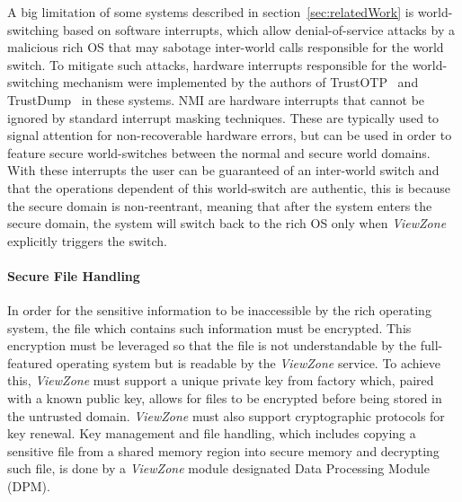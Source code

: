 A big limitation of some systems described in section~\ref{sec:relatedWork} is world-switching based on software interrupts, which allow denial-of-service attacks by a malicious rich OS that may sabotage inter-world calls responsible for the world switch. To mitigate such attacks, hardware interrupts responsible for the world-switching mechanism were implemented by the authors of TrustOTP~\cite{sun2015trustotp} and TrustDump~\cite{sun2015reliable} in these systems. \ac{NMI} are hardware interrupts that cannot be ignored by standard interrupt masking techniques. These are typically used to signal attention for non-recoverable hardware errors, but can be used in order to feature secure world-switches between the normal and secure world domains. With these interrupts the user can be guaranteed of an inter-world switch and that the operations dependent of this world-switch are authentic, this is because the secure domain is non-reentrant, meaning that after the system enters the secure domain, the system will switch back to the rich OS only when \emph{ViewZone} explicitly triggers the switch.

\paragraph{\textbf{Secure File Handling}}


In order for the sensitive information to be inaccessible by the rich operating system, the file which contains such information must be encrypted. This encryption must be leveraged so that the file is not understandable by the full-featured operating system but is readable by the \emph{ViewZone} service. To achieve this, \emph{ViewZone} must support a unique private key from factory which, paired with a known public key, allows for files to be encrypted before being stored in the untrusted domain. \emph{ViewZone} must also support cryptographic protocols for key renewal. Key management and file handling, which includes copying a sensitive file from a shared memory region into secure memory and decrypting such file, is done by a \emph{ViewZone} module designated Data Processing Module (DPM).

